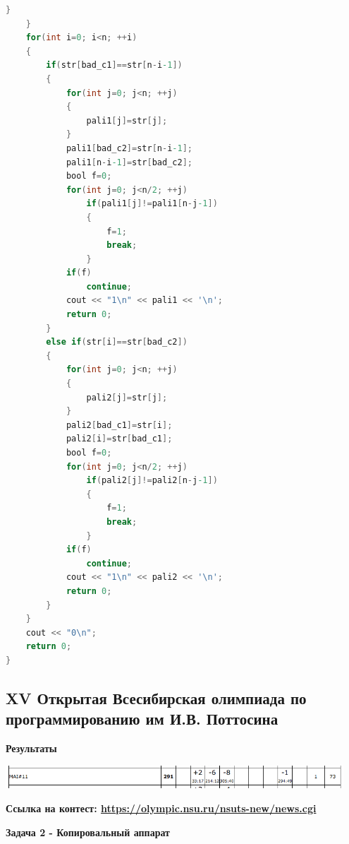 \documentclass[a4paper,12pt]{article}
\begin{document}
\begin{lstlisting}[language=C]
        }
    }
    for(int i=0; i<n; ++i)
    {
        if(str[bad_c1]==str[n-i-1])
        {
            for(int j=0; j<n; ++j)
            {
                pali1[j]=str[j];
            }
            pali1[bad_c2]=str[n-i-1];
            pali1[n-i-1]=str[bad_c2];
            bool f=0;
            for(int j=0; j<n/2; ++j)
                if(pali1[j]!=pali1[n-j-1])
                {
                    f=1;
                    break;
                }
            if(f)
                continue;
            cout << "1\n" << pali1 << '\n';
            return 0;
        }
        else if(str[i]==str[bad_c2])
        {
            for(int j=0; j<n; ++j)
            {
                pali2[j]=str[j];
            }
            pali2[bad_c1]=str[i];
            pali2[i]=str[bad_c1];
            bool f=0;
            for(int j=0; j<n/2; ++j)
                if(pali2[j]!=pali2[n-j-1])
                {
                    f=1;
                    break;
                }
            if(f)
                continue;
            cout << "1\n" << pali2 << '\n';
            return 0;
        }
    }
    cout << "0\n";
    return 0;
}
\end{lstlisting}



%
%

\newpage
\subsection{XV Открытая Всесибирская олимпиада по программированию им И.В. Поттосина}

\textbf{{\large Результаты}} \\
\begin{center}
\includegraphics[width=0.95\textwidth]{Siberia/Siberia_result.png}\\ [1cm]
\end{center}

\textbf{{\large Ссылка на контест: \url{https://olympic.nsu.ru/nsuts-new/news.cgi}}}

\newpage
\textbf{{\large Задача 2 - Копировальный аппарат}}
\end{document}
